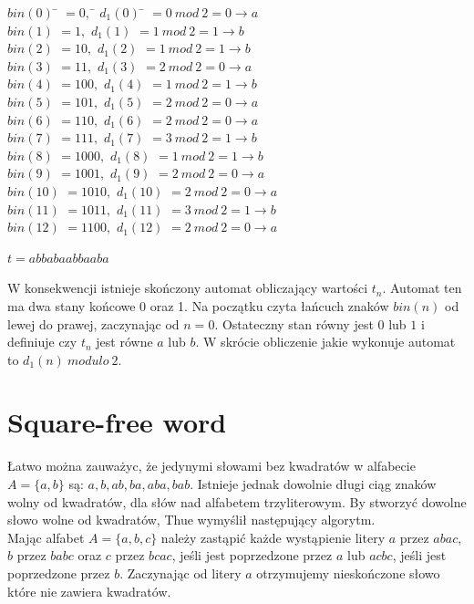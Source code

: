 \documentclass[document]{xmgr}
\begin{document}
\begin{tabbing}
$bin(0)$\hspace{1em} \= $= 0,$\hspace{7em} \= $d_1 (0)$\hspace{1em} \= $= 0\ mod\ 2 = 0 \to a$ \\
$bin(1)$ \> $= 1,$ \> $d_1 (1)$ \> $= 1\ mod\ 2 = 1 \to b$\\
$bin(2)$ \> $= 10,$ \> $d_1 (2)$ \> $= 1\ mod\ 2 = 1 \to b$\\
$bin(3)$ \> $= 11,$ \> $d_1 (3)$ \> $= 2\ mod\ 2 = 0 \to a$\\
$bin(4)$ \> $= 100,$ \> $d_1 (4)$ \> $= 1\ mod\ 2 = 1 \to b$\\
$bin(5)$ \> $= 101,$ \> $d_1 (5)$ \> $= 2\ mod\ 2 = 0 \to a$\\
$bin(6)$ \> $= 110,$ \> $d_1 (6)$ \> $= 2\ mod\ 2 = 0 \to a$\\
$bin(7)$ \> $= 111,$ \> $d_1 (7)$ \> $= 3\ mod\ 2 = 1 \to b$\\
$bin(8)$ \> $= 1000,$ \> $d_1 (8)$ \> $= 1\ mod\ 2 = 1 \to b$\\
$bin(9)$ \> $= 1001,$ \> $d_1 (9)$ \> $= 2\ mod\ 2 = 0 \to a$\\
$bin(10)$ \> $= 1010,$	\> $d_1 (10)$ \> $= 2\ mod\ 2 = 0 \to a$\\
$bin(11)$ \> $= 1011,$ 	\> $d_1 (11)$ \> $= 3\ mod\ 2 = 1 \to b$\\
$bin(12)$ \> $= 1100,$ 	\> $d_1 (12)$ \> $= 2\ mod\ 2 = 0 \to a$
\end{tabbing}

{\centering $t = abbabaabbaaba$ \par}

W konsekwencji istnieje skończony automat obliczający wartości $t_n$. Automat ten ma dwa stany końcowe 0 oraz 1. Na początku czyta łańcuch znaków $bin(n)$ od lewej do prawej, zaczynając od $n=0$. Ostateczny stan równy jest $0$ lub $1$ i definiuje czy $t_n$ jest równe $a$ lub $b$. W skrócie obliczenie jakie wykonuje automat to $d_1(n)\ modulo\ 2$.


\section{Square-free word}
Łatwo można zauważyc, że jedynymi słowami bez kwadratów w alfabecie $A = \{a, b\}$ są: $a, b, ab, ba, aba, bab$. Istnieje jednak dowolnie długi ciąg znaków wolny od kwadratów, dla słów nad alfabetem trzyliterowym. By stworzyć dowolne słowo wolne od kwadratów, Thue wymyślił następujący algorytm.\\
Mając alfabet $A = \{a, b, c\}$ należy zastąpić każde wystąpienie litery $a$ przez $abac$,  $b$ przez $babc$ oraz $c$ przez $bcac$, jeśli jest poprzedzone przez $a$ lub $acbc$, jeśli jest poprzedzone przez $b$. Zaczynając od litery $a$ otrzymujemy nieskończone słowo które nie zawiera kwadratów.
\end{document}

